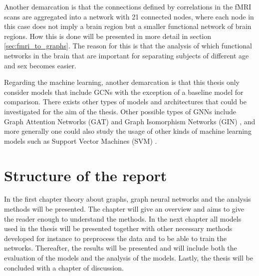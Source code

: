 Another demarcation is that the connections defined by correlations in the fMRI scans are aggregated into a network with 21 connected nodes, where each node in this case does not imply a brain region but a smaller functional network of brain regions. How this is done will be presented in more detail in section \ref{sec:fmri_to_graphs}. The reason for this is that the analysis of which functional networks in the brain that are important for separating subjects of different age and sex becomes easier. 

Regarding the machine learning, another demarcation is that this thesis only consider models that include GCNs with the exception of a baseline model for comparison. There exists other types of models and architectures that could be investigated for the aim of the thesis. Other possible types of GNNs include Graph Attention Networks (GAT) \cite{gat} and Graph Isomorphism Networks (GIN) \cite{gin}, and more generally one could also  study the usage of other kinds of machine learning models such as Support Vector Machines (SVM) \cite{neuro_ml}.


\section{Structure of the report}
In the first chapter theory about graphs, graph neural networks and the analysis methods will be presented. The chapter will give an overview and aims to give the reader enough to understand the methods. In the next chapter all models used in the thesis will be presented together with other necessary methods developed for instance to preprocess the data and to be able to train the networks. Thereafter, the results will be presented and will include both the evaluation of the models and the analysis of the models. Lastly, the thesis will be concluded with a chapter of discussion. 

